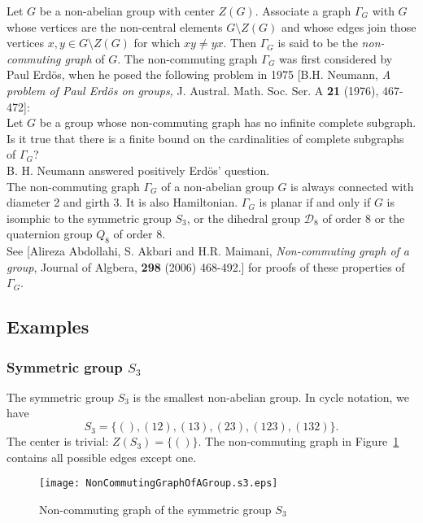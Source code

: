 \documentclass[12pt]{article}
\newcommand{\<}{\langle}
\renewcommand{\>}{\rangle}
\newcommand{\mc}{\mathcal}
\begin{document}
Let $G$ be a non-abelian group with center $Z(G)$.  Associate a graph
$\Gamma_G$ with $G$ whose vertices are the non-central elements
$G\setminus Z(G)$ and whose edges join those vertices $x,y\in
G\setminus Z(G)$ for which $xy\neq yx$. Then $\Gamma_G$ is said to be
the \emph{non-commuting graph} of $G$.
The non-commuting graph $\Gamma_G$ was first considered by Paul
Erd\"os, when he posed the following problem in 1975 [B.H. Neumann,  {\sl A problem of Paul Erd\"os on
groups,}  J. Austral. Math. Soc. Ser. A {\bf 21} (1976), 467-472]:\\
 Let
$G$ be a group whose non-commuting graph has no infinite complete
subgraph. Is it true that there is a finite bound on the
cardinalities of complete subgraphs   of $\Gamma_G$?\\
B. H. Neumann  answered positively Erd\"os' question.\\
The non-commuting graph $\Gamma_G$ of a non-abelian group $G$ is always connected with diameter 2 and girth 3.
It is also Hamiltonian.  $\Gamma_G$ is planar if and only if $G$ is isomphic to the symmetric group $S_3$, or 
the dihedral group $\mc{D}_8$ of order $8$ or the quaternion group $Q_8$ of order $8$.\\
See 
[Alireza Abdollahi, S. Akbari and H.R. Maimani, {\sl Non-commuting graph of a group}, Journal of Algbera, {\bf 298} (2006) 468-492.] for  proofs of these properties of $\Gamma_G$.  


\subsection*{Examples}

\subsubsection*{Symmetric group $S_3$}
The symmetric group $S_3$ is the smallest non-abelian group. In cycle
notation, we have
\begin{equation*}
S_3=\{(),(12),(13),(23),(123),(132)\}.
\end{equation*}
The center is trivial: $Z(S_3)=\{()\}$. The non-commuting graph in
Figure~\ref{fig:s3} contains all possible edges except one.

\begin{figure}
\label{fig:s3}
\begin{center}
\texttt{[image: NonCommutingGraphOfAGroup.s3.eps]}
\end{center}
\sf\caption{Non-commuting graph of the symmetric group $S_3$}
\end{figure}
\end{document}
